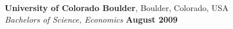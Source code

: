 \documentclass[margin,line]{resume}
\begin{document}
\begin{resume}
\textbf{University of Colorado Boulder}, Boulder, Colorado, USA \vspace{1mm}\\\vspace{1mm}%
    \textsl{Bachelors of Science, Economics} \hfill \textbf{ August 2009}\vspace{-3mm}\\\vspace{-1mm}%



\end{resume}
\end{document}

